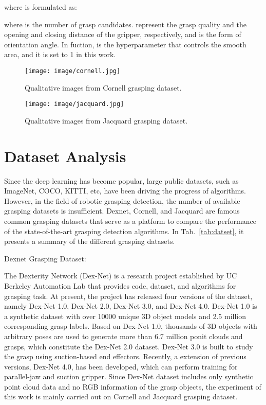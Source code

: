 \documentclass[journal]{IEEEtran}
\begin{document}
where  is formulated as:



where  is the number of grasp candidates.  represent the grasp quality and the opening and closing distance of the gripper, respectively, and  is the form of orientation angle. In  fuction,  is the hyperparameter that controls the smooth area, and it is set to 1 in this work.




\begin{figure}[t!]
	\centering
{\texttt{[image: image/cornell.jpg]}}
	\caption{Qualitative images from Cornell grasping dataset.}
	\label{fig:Cornell}
\end{figure} 

\begin{figure}[t!]
	\centering
{\texttt{[image: image/jacquard.jpg]}}
	\caption{Qualitative images from Jacquard grasping dataset.}
	\label{fig:Jacquard}
\end{figure} 

\section{Dataset Analysis}
\label{sec:Dataset}
Since the deep learning has become popular, large public datasets, such as ImageNet, COCO, KITTI, etc, have been driving the progress of algorithms. However, in the field of robotic grasping detection, the number of available grasping datasets is insufficient. Dexnet, Cornell, and Jacquard are famous common grasping datasets that serve as a platform to compare the performance of the state-of-the-art grasping detection algorithms. In Tab.~\ref{tab:datset}, it presents a summary of the different grasping datasets.

\begin{bfseries}
	Dexnet Grasping Dataset:
\end{bfseries} 
The Dexterity Network (Dex-Net) is a research project established by UC Berkeley Automation Lab that provides code, dataset, and algorithms for grasping task. At present, the project has released four versions of the dataset, namely Dex-Net 1.0, Dex-Net 2.0, Dex-Net 3.0, and Dex-Net 4.0. Dex-Net 1.0 is a synthetic dataset with over 10000 unique 3D object models and 2.5 million corresponding grasp labels. Based on Dex-Net 1.0, thousands of 3D objects with arbitrary poses are used to generate more than 6.7 million ponit clouds and grasps, which constitute the Dex-Net 2.0 dataset. Dex-Net 3.0 is built to study the grasp using suction-based end effectors. Recently, a extension of previous versions, Dex-Net 4.0, has been developed, which can perform training for parallel-jaw and suction gripper. Since Dex-Net dataset includes only synthetic point cloud data and no RGB information of the grasp objects, the experiment of this work is mainly carried out on Cornell and Jacquard grasping dataset.
\end{document}
